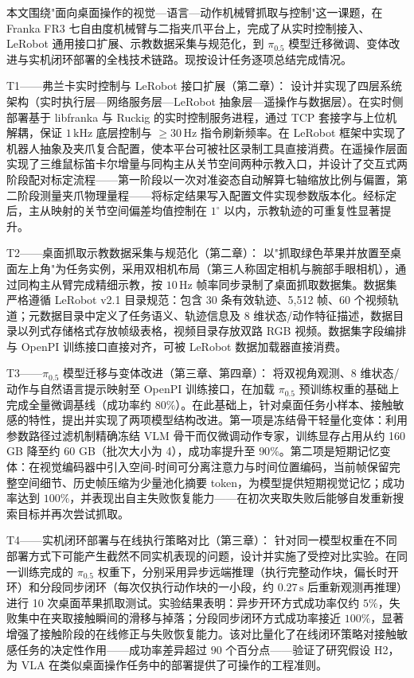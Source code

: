 
\begin{conclusion}
本文围绕"面向桌面操作的视觉—语言—动作机械臂抓取与控制"这一课题，在 Franka FR3 七自由度机械臂与二指夹爪平台上，完成了从实时控制接入、LeRobot 通用接口扩展、示教数据采集与规范化，到 $\pi_{0.5}$ 模型迁移微调、变体改进与实机闭环部署的全栈技术链路。现按设计任务逐项总结完成情况。

T1——弗兰卡实时控制与 LeRobot 接口扩展（第二章）：
设计并实现了四层系统架构（实时执行层—网络服务层—LeRobot 抽象层—遥操作与数据层）。在实时侧部署基于 libfranka 与 Ruckig 的实时控制服务进程，通过 TCP 套接字与上位机解耦，保证 $1\,\mathrm{kHz}$ 底层控制与 $\geqslant 30\,\mathrm{Hz}$ 指令刷新频率。在 LeRobot 框架中实现了机器人抽象及夹爪复合配置，使本平台可被社区录制工具直接消费。在遥操作层面实现了三维鼠标笛卡尔增量与同构主从关节空间两种示教入口，并设计了交互式两阶段配对标定流程——第一阶段以一次对准姿态自动解算七轴缩放比例与偏置，第二阶段测量夹爪物理量程——将标定结果写入配置文件实现参数版本化。经标定后，主从映射的关节空间偏差均值控制在 $1^\circ$ 以内，示教轨迹的可重复性显著提升。

T2——桌面抓取示教数据采集与规范化（第二章）：
以"抓取绿色苹果并放置至桌面左上角"为任务实例，采用双相机布局（第三人称固定相机与腕部手眼相机），通过同构主从臂完成精细示教，按 $10\,\mathrm{Hz}$ 帧率同步录制了桌面抓取数据集。数据集严格遵循 LeRobot v2.1 目录规范：包含 30 条有效轨迹、5,512 帧、60 个视频轨道；元数据目录中定义了任务语义、轨迹信息及 8 维状态/动作特征描述，数据目录以列式存储格式存放帧级表格，视频目录存放双路 RGB 视频。数据集字段编排与 OpenPI 训练接口直接对齐，可被 LeRobot 数据加载器直接消费。

T3——$\pi_{0.5}$ 模型迁移与变体改进（第三章、第四章）：
将双视角观测、8 维状态/动作与自然语言提示映射至 OpenPI 训练接口，在加载 $\pi_{0.5}$ 预训练权重的基础上完成全量微调基线（成功率约 $80\%$）。在此基础上，针对桌面任务小样本、接触敏感的特性，提出并实现了两项模型结构改进。第一项是冻结骨干轻量化变体：利用参数路径过滤机制精确冻结 VLM 骨干而仅微调动作专家，训练显存占用从约 160 GB 降至约 60 GB（批次大小为 4），成功率提升至 $90\%$。第二项是短期记忆变体：在视觉编码器中引入空间-时间可分离注意力与时间位置编码，当前帧保留完整空间细节、历史帧压缩为少量池化摘要 token，为模型提供短期视觉记忆；成功率达到 $100\%$，并表现出自主失败恢复能力——在初次夹取失败后能够自发重新搜索目标并再次尝试抓取。

T4——实机闭环部署与在线执行策略对比（第三章）：
针对同一模型权重在不同部署方式下可能产生截然不同实机表现的问题，设计并实施了受控对比实验。在同一训练完成的 $\pi_{0.5}$ 权重下，分别采用异步远端推理（执行完整动作块，偏长时开环）和分段同步闭环（每次仅执行动作块的一小段，约 $0.27\,\mathrm{s}$ 后重新观测再推理）进行 10 次桌面苹果抓取测试。实验结果表明：异步开环方式成功率仅约 $5\%$，失败集中在夹取接触瞬间的滑移与掉落；分段同步闭环方式成功率接近 $100\%$，显著增强了接触阶段的在线修正与失败恢复能力。该对比量化了在线闭环策略对接触敏感任务的决定性作用——成功率差异超过 $90$ 个百分点——验证了研究假设 H2，为 VLA 在类似桌面操作任务中的部署提供了可操作的工程准则。


\end{conclusion}
